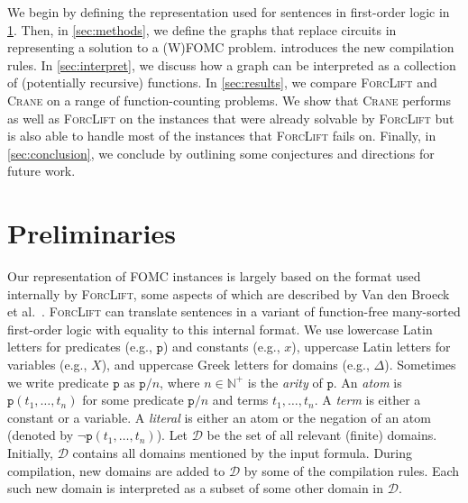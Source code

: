 \documentclass{article}
\theoremstyle{definition}
\theoremstyle{remark}
\begin{document}

We begin by defining the representation used for sentences in first-order logic
in \cref{sec:recprelims}. Then, in \cref{sec:methods}, we define the graphs that
replace circuits in representing a solution to a (W)FOMC problem.
 introduces the new compilation rules. In \cref{sec:interpret},
we discuss how a graph can be interpreted as a collection of (potentially
recursive) functions. In \cref{sec:results}, we compare \textsc{ForcLift} and
\textsc{Crane} on a range of function-counting problems. We show that
\textsc{Crane} performs as well as \textsc{ForcLift} on the instances that were
already solvable by \textsc{ForcLift} but is also able to handle most of the
instances that \textsc{ForcLift} fails on. Finally, in \cref{sec:conclusion}, we
conclude by outlining some conjectures and directions for future work.

\section{Preliminaries}\label{sec:recprelims}



Our representation of FOMC instances is largely based on the format used
internally by \textsc{ForcLift}, some aspects of which are described by Van den
Broeck et al.~. \textsc{ForcLift} can
translate sentences in a variant of function-free many-sorted first-order logic
with equality to this internal format. We use lowercase Latin letters for
predicates (e.g., $\texttt{p}$) and constants (e.g., $x$), uppercase Latin
letters for variables (e.g., $X$), and uppercase Greek letters for domains
(e.g., $\Delta$). Sometimes we write predicate $\texttt{p}$ as $\texttt{p}/n$,
where $n \in \mathbb{N}^{+}$ is the \emph{arity} of $\texttt{p}$. An \emph{atom}
is $\texttt{p}(t_1, \dots, t_n)$ for some predicate $\texttt{p}/n$ and terms
$t_{1}, \dots, t_{n}$. A \emph{term} is either a constant or a variable. A
\emph{literal} is either an atom or the negation of an atom (denoted by
$\neg \texttt{p}(t_1, \dots, t_n)$). Let $\mathcal{D}$ be the set of all
relevant (finite) domains. Initially, $\mathcal{D}$ contains all domains
mentioned by the input formula. During compilation, new domains are added to
$\mathcal{D}$ by some of the compilation rules. Each such new domain is
interpreted as a subset of some other domain in $\mathcal{D}$.
\end{document}
